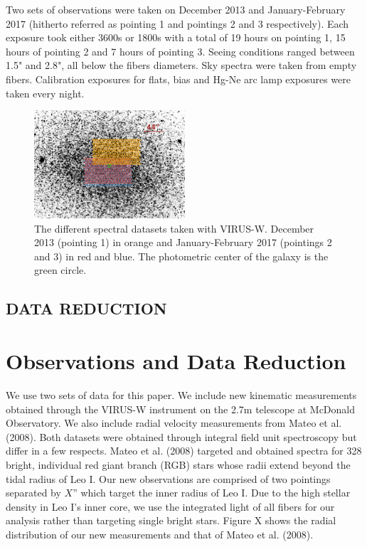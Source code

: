 \documentclass[%
 aip,
 twocolumn,
 jmp,%
 amsmath,amssymb,
 reprint,%
]{aastex61}
\begin{document}
Two sets of observations were taken on December 2013 and January-February 2017 (hitherto referred as pointing 1 and pointings 2 and 3 respectively). Each exposure took either 3600s or 1800s with a total of 19 hours on pointing 1, 15 hours of pointing 2 and 7 hours of pointing 3. Seeing conditions ranged between 1.5" and 2.8", all below the fibers diameters. Sky spectra were taken from empty fibers. Calibration exposures for flats, bias and Hg-Ne arc lamp exposures were taken every night.
\begin{figure}
\centering
\includegraphics[width=0.5\textwidth]{pointing_inv.png}
\caption{The different spectral datasets taken with VIRUS-W. December 2013 (pointing 1) in orange and January-February 2017 (pointings 2 and 3) in red and blue. The photometric center of the galaxy is the green circle.}            
\end{figure}
    
\subsection{DATA REDUCTION}
\section{Observations and Data Reduction}


We use two sets of data for this paper.  We include new kinematic measurements obtained through the VIRUS-W instrument on the 2.7m telescope at McDonald Observatory.  We also include radial velocity measurements from Mateo et al. (2008).  Both datasets were obtained through integral field unit spectroscopy but differ in a few respects.  Mateo et al. (2008) targeted and obtained spectra for 328 bright, individual red giant branch (RGB) stars whose radii extend beyond the tidal radius of Leo I.  Our new observations are comprised of two pointings separated by $X”$ which target the inner radius of Leo I.  Due to the high stellar density in Leo I’s inner core, we use the integrated light of all fibers for our analysis rather than targeting single bright stars.  Figure X shows the radial distribution of our new measurements and that of Mateo et al. (2008). 
\end{document}
